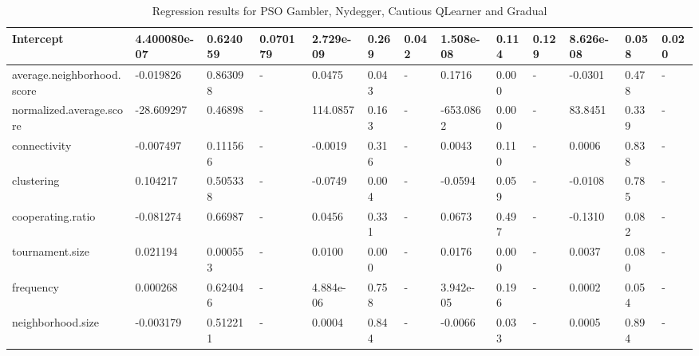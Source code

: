\begin{table}[!hbtp]
\begin{adjustbox}{width=1\textwidth}
\begin{tabular}{|l|l|l|l|l|l|l|l|l|l|l|l|l|}
			Intercept                  & 4.400080e-07 & 0.624059    & 0.070179      & 2.729e-09   & 0.269       & 0.042         & 1.508e-08   & 0.114       & 0.129         & 8.626e-08       & 0.058       & 0.020         \\ \hline
			average.neighborhood.score & -0.019826    & 0.863098    & -             & 0.0475      & 0.043       & -             & 0.1716      & 0.000       & -             & -0.0301         & 0.478       & -             \\ \hline
			normalized.average.score   & -28.609297   & 0.46898     & -             & 114.0857    & 0.163       & -             & -653.0862   & 0.000       & -             & 83.8451         & 0.339       & -             \\ \hline
			connectivity               & -0.007497    & 0.111566    & -             & -0.0019     & 0.316       & -             & 0.0043      & 0.110       & -             & 0.0006          & 0.838       & -             \\ \hline
			clustering                 & 0.104217     & 0.505338    & -             & -0.0749     & 0.004       & -             & -0.0594     & 0.059       & -             & -0.0108         & 0.785       & -             \\ \hline
			cooperating.ratio          & -0.081274    & 0.66987     & -             & 0.0456      & 0.331       & -             & 0.0673      & 0.497       & -             & -0.1310         & 0.082       & -             \\ \hline
			tournament.size            & 0.021194     & 0.000553    & -             & 0.0100      & 0.000       & -             & 0.0176      & 0.000       & -             & 0.0037          & 0.080       & -             \\ \hline
			frequency                  & 0.000268     & 0.624046    & -             & 4.884e-06   & 0.758       & -             & 3.942e-05   & 0.196       & -             & 0.0002          & 0.054       & -             \\ \hline
			neighborhood.size          & -0.003179    & 0.512211    & -             & 0.0004      & 0.844       & -             & -0.0066     & 0.033       & -             & 0.0005          & 0.894       & -             \\ \hline

		\end{tabular}
	\end{adjustbox}
	\caption{Regression results for PSO Gambler, Nydegger, Cautious QLearner and Gradual}
	\label{reg-for-top}
\end{table}

